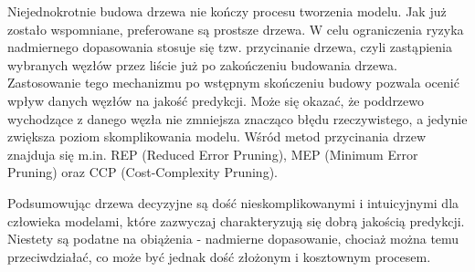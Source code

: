 Niejednokrotnie budowa drzewa nie kończy procesu tworzenia modelu. Jak już zostało wspomniane, preferowane są prostsze drzewa. W celu ograniczenia ryzyka nadmiernego dopasowania stosuje się tzw. przycinanie drzewa, czyli zastąpienia wybranych węzłów przez liście już po zakończeniu budowania drzewa. Zastosowanie tego mechanizmu po wstępnym skończeniu budowy pozwala ocenić wpływ danych węzłów na jakość predykcji. Może się okazać, że poddrzewo wychodzące z danego węzła nie zmniejsza znacząco błędu rzeczywistego, a jedynie zwiększa poziom skomplikowania modelu. Wśród metod przycinania drzew znajduja się m.in. REP (Reduced Error Pruning), MEP (Minimum Error Pruning) oraz CCP (Cost-Complexity Pruning).

Podsumowując drzewa decyzyjne są dość nieskomplikowanymi i intuicyjnymi dla człowieka modelami, które zazwyczaj charakteryzują się dobrą jakością predykcji. Niestety są podatne na obiążenia - nadmierne dopasowanie, chociaż można temu przeciwdziałać, co może być jednak dość złożonym i kosztownym procesem.
